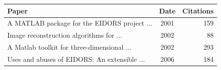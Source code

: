\documentclass[portrait,final,a0paper,fontscale=0.277]{baposter}
\begin{document}
\begin{poster}
{\begin{tabular}{lcr}
  \toprule
  Paper & Date & \hspace{-2mm}Citations \\
  \midrule
  \cite{vauhkonen2001} A MATLAB package for the EIDORS project {\tiny ...}  
    & 2001 & 159 \\
  \cite{polydorides2002phd} Image reconstruction algorithms for {\tiny ...}  
    & 2002 & 88 \\
  \cite{polydorides2002matlab} A Matlab toolkit for three-dimensional {\tiny ...}  
    & 2002 & 293 \\
  \cite{adler2006} Uses and abuses of {EIDORS}: An extensible {\tiny ...} 
    & 2006 & 184 \\
  \bottomrule
\end{tabular}
   \vspace{0.3em}
}

\end{poster}
\end{document}
